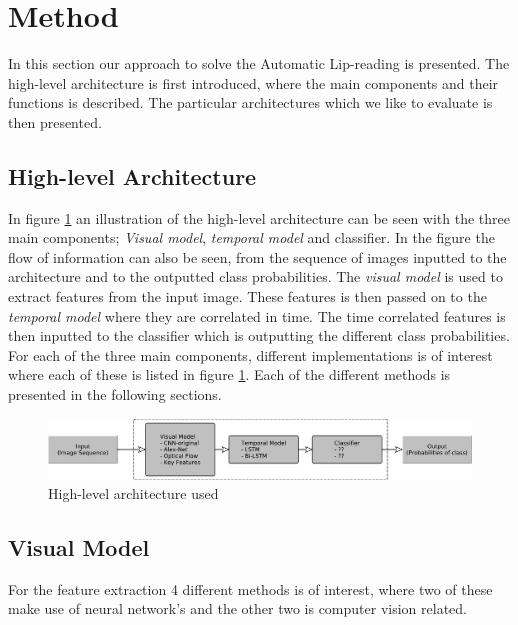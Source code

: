 \section{Method}
\label{sec:method}

In this section our approach to solve the Automatic Lip-reading is presented.
The high-level architecture is first introduced, where the main components and their functions is described.
The particular architectures which we like to evaluate is then presented.

\subsection{High-level Architecture}
In figure \ref{fig:highLevelArchitecture} an illustration of the high-level architecture can be seen with the three main components; \textit{Visual model}, \textit{temporal model} and classifier.
In the figure the flow of information can also be seen, from the sequence of images inputted to the architecture and to the outputted class probabilities. 
The \textit{visual model} is used to extract features from the input image.
These features is then passed on to the \textit{temporal model} where they are correlated in time.
The time correlated features is then inputted to the classifier which is outputting the different class probabilities.
For each of the three main components, different implementations is of interest where each of these is listed in figure \ref{fig:highLevelArchitecture}. 
Each of the different methods is presented in the following sections.
\begin{figure}
    \centering
    \includegraphics[width=\columnwidth]{fig/highLevelArchitecture.pdf}
    \caption{High-level architecture used}
    \label{fig:highLevelArchitecture}
\end{figure}

\subsection{Visual Model}
For the feature extraction 4 different methods is of interest, where two of these make use of neural network's and the other two is computer vision related.

